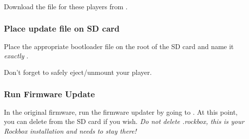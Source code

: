 Download the  file for these players from .


\subsubsection{Place update file on SD card}\label{ref:place_on_sd_card}
Place the appropriate bootloader file on the root of the SD card and name it
\emph{exactly} .


Don't forget to safely eject/unmount your player.

\subsubsection{Run Firmware Update}\label{ref:run_firmware_update}
In the original firmware, run the firmware updater by going to
. At this point, you can delete
 from the SD card if you wish. \emph{Do not delete .rockbox,
this is your Rockbox installation and needs to stay there!}